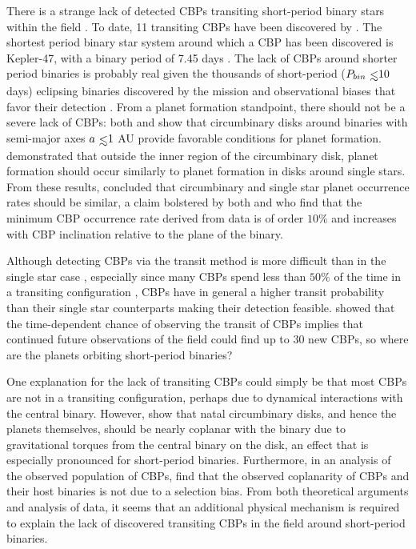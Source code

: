 There is a strange lack of detected CBPs transiting short-period binary stars within the \kepler field \citep{Welsh2014}. To date, 11 transiting CBPs have been discovered by \kepler.  The shortest period binary star system around which a CBP has been discovered is Kepler-47, with a binary period of 7.45 days \citep{Orosz2012}.  The lack of CBPs around shorter period binaries is probably real given the thousands of short-period ($P_{bin} \lsim 10$ days) eclipsing binaries discovered by the \kepler mission \citep{Kirk2016} and observational biases that favor their detection \citep{Munoz2015}.  From a planet formation standpoint, there should not be a severe lack of CBPs: both \citet{Alexander2012} and \citet{Vartanyan2016} show that circumbinary disks around binaries with semi-major axes $a \lsim 1$ AU provide favorable conditions for planet formation. \citet{Bromley2015} demonstrated that outside the inner region of the circumbinary disk, planet formation should occur similarly to planet formation in disks around single stars.  From these results, \citet{Bromley2015} concluded that circumbinary and single star planet occurrence rates should be similar, a claim bolstered by both \citet{Martin2014} and \citet{Armstrong2014} who find that the minimum CBP occurrence rate derived from \kepler data is of order $10\%$ and increases with CBP inclination relative to the plane of the binary.  

Although detecting CBPs via the transit method is more difficult than in the single star case \citep{Welsh2014,Winn2015}, especially since many CBPs spend less than $50 \%$ of the time in a transiting configuration \citep{Martin2017}, CBPs have in general a higher transit probability than their single star counterparts \citep{Martin2015a} making their detection feasible.  \citet{Martin2017} showed that the time-dependent chance of observing the transit of CBPs implies that continued future observations of the \kepler field could find up to 30 new CBPs, so where are the planets orbiting short-period binaries?

One explanation for the lack of transiting CBPs could simply be that most CBPs are not in a transiting configuration, perhaps due to dynamical interactions with the central binary.  However, \citet{Foucart2013} show that natal circumbinary disks, and hence the planets themselves, should be nearly coplanar with the binary due to gravitational torques from the central binary on the disk, an effect that is especially pronounced for short-period binaries.  Furthermore, in an analysis of the observed population of \kepler CBPs, \citet{Li2016} find that the observed coplanarity of CBPs and their host binaries is not due to a selection bias.  From both theoretical arguments and analysis of \kepler data, it seems that an additional physical mechanism is required to explain the lack of discovered transiting CBPs in the \kepler field around short-period binaries.


